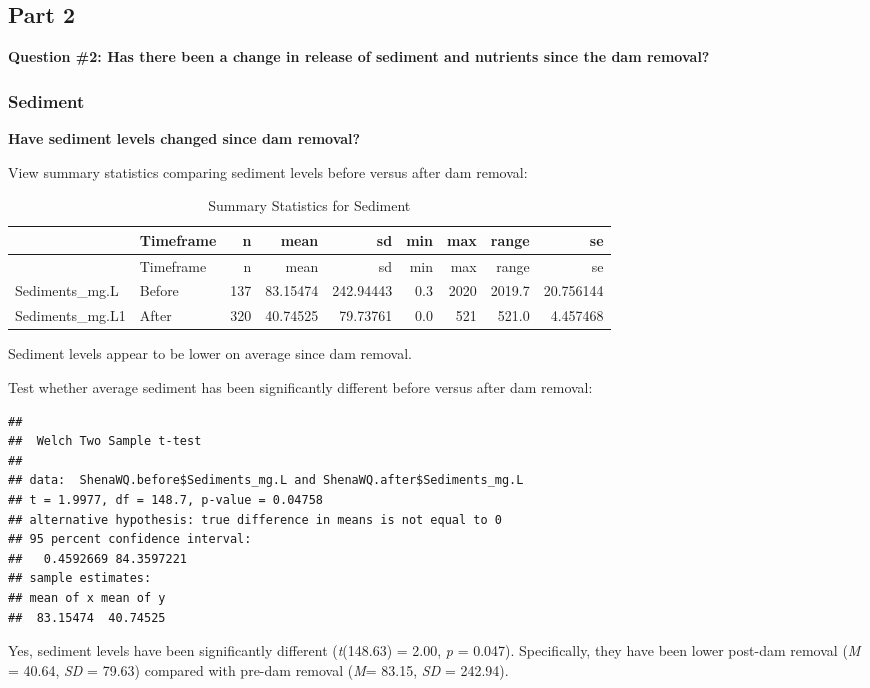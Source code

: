 \documentclass[
  12pt,
]{article}
\begin{document}
\newpage

\hypertarget{part-2}{%
\subsection{Part 2}\label{part-2}}

\textbf{Question \#2: Has there been a change in release of sediment and
nutrients since the dam removal?}

\hypertarget{sediment}{%
\subsubsection{Sediment}\label{sediment}}

\textbf{Have sediment levels changed since dam removal?}

View summary statistics comparing sediment levels before versus after
dam removal:

\begin{longtable}[]{@{}llrrrrrrr@{}}
\caption{Summary Statistics for Sediment}\tabularnewline
\toprule
& Timeframe & n & mean & sd & min & max & range & se \\
\midrule
\endfirsthead
\toprule
& Timeframe & n & mean & sd & min & max & range & se \\
\midrule
\endhead
Sediments\_mg.L & Before & 137 & 83.15474 & 242.94443 & 0.3 & 2020 &
2019.7 & 20.756144 \\
Sediments\_mg.L1 & After & 320 & 40.74525 & 79.73761 & 0.0 & 521 & 521.0
& 4.457468 \\
\bottomrule
\end{longtable}

Sediment levels appear to be lower on average since dam removal.

Test whether average sediment has been significantly different before
versus after dam removal:

\begin{verbatim}
## 
##  Welch Two Sample t-test
## 
## data:  ShenaWQ.before$Sediments_mg.L and ShenaWQ.after$Sediments_mg.L
## t = 1.9977, df = 148.7, p-value = 0.04758
## alternative hypothesis: true difference in means is not equal to 0
## 95 percent confidence interval:
##   0.4592669 84.3597221
## sample estimates:
## mean of x mean of y 
##  83.15474  40.74525
\end{verbatim}

Yes, sediment levels have been significantly different (\emph{t}(148.63)
= 2.00, \emph{p} = 0.047). Specifically, they have been lower post-dam
removal (\emph{M} = 40.64, \emph{SD} = 79.63) compared with pre-dam
removal (\emph{M}= 83.15, \emph{SD} = 242.94).
\end{document}
